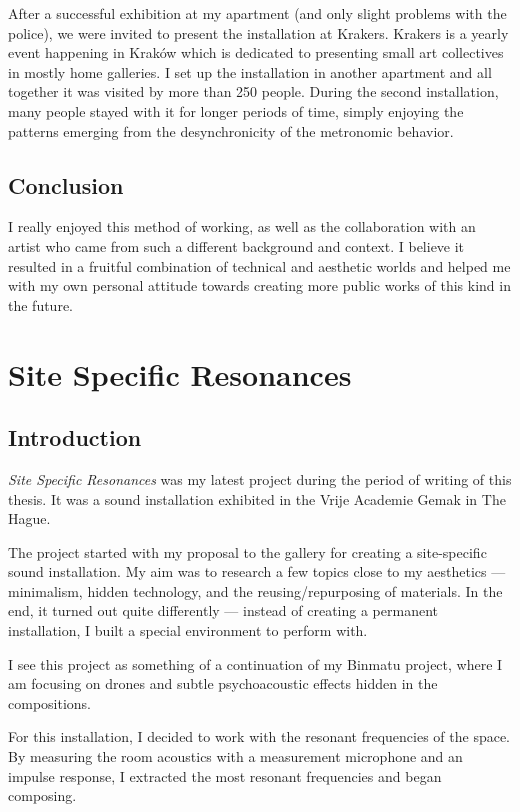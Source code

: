 \documentclass[12pt,a4paper,oneside]{report}
\begin{document}
After a successful exhibition at my apartment (and only slight problems with the police), we were invited to present the installation at Krakers. Krakers is a yearly event happening in Kraków which is dedicated to presenting small art collectives in mostly home galleries. I set up the installation in another apartment and all together it was visited by more than 250 people. During the second installation, many people stayed with it for longer periods of time, simply enjoying the patterns emerging from the desynchronicity of the metronomic behavior.

\subsection{Conclusion}

I really enjoyed this method of working, as well as the collaboration with an artist who came from such a different background and context. I believe it resulted in a fruitful combination of technical and aesthetic worlds and helped me with my own personal attitude towards creating more public works of this kind in the future.


\section{Site Specific Resonances}

\subsection{Introduction}

\emph{Site Specific Resonances} was my latest project during the period of writing of this thesis. It was a sound installation exhibited in the Vrije Academie Gemak in The Hague.

The project started with my proposal to the gallery for creating a site-specific sound installation. My aim was to research a few topics close to my aesthetics --- minimalism, hidden technology, and the reusing/repurposing of materials. In the end, it turned out quite differently --- instead of creating a permanent installation, I built a special environment to perform with. 

I see this project as something of a continuation of my Binmatu project, where I am focusing on drones and subtle psychoacoustic effects hidden in the compositions.

For this installation, I decided to work with the resonant frequencies of the space. By measuring the room acoustics with a measurement microphone and an impulse response, I extracted the most resonant frequencies and began composing.
\end{document}
